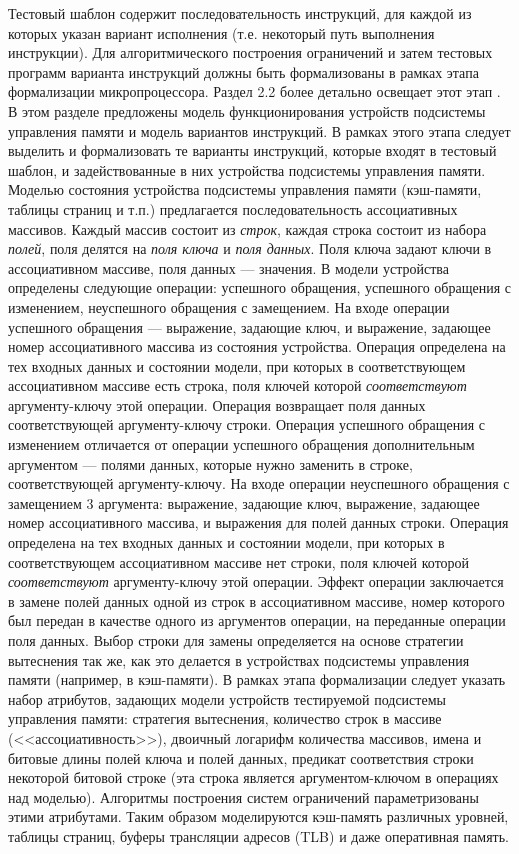 \documentclass[14pt,autoref,href
,facsimile
]{disser}
\begin{document}
Тестовый шаблон содержит последовательность инструкций, для каждой из которых указан вариант исполнения (т.е. некоторый путь выполнения инструкции). Для алгоритмического построения ограничений и затем тестовых программ варианта инструкций должны быть формализованы в рамках этапа формализации микропроцессора. Раздел 2.2 более детально освещает этот этап . В этом разделе предложены модель функционирования устройств подсистемы управления памяти и модель вариантов инструкций. В рамках этого этапа следует выделить и формализовать те варианты инструкций, которые входят в тестовый шаблон, и задействованные в них устройства подсистемы управления памяти. Моделью состояния устройства подсистемы управления памяти (кэш-памяти, таблицы страниц и т.п.) предлагается последовательность ассоциативных массивов. Каждый массив состоит из \emph{строк}, каждая строка состоит из набора \emph{полей}, поля делятся на \emph{поля ключа} и \emph{поля данных}. Поля ключа задают ключи в ассоциативном массиве, поля данных --- значения. В модели устройства определены следующие операции: успешного обращения, успешного обращения с изменением, неуспешного обращения с замещением. На входе операции успешного обращения --- выражение, задающие ключ, и выражение, задающее номер ассоциативного массива из состояния устройства. Операция определена на тех входных данных и состоянии модели, при которых в соответствующем ассоциативном массиве есть строка, поля ключей которой \emph{соответствуют} аргументу-ключу этой операции. Операция возвращает поля данных соответствующей аргументу-ключу строки. Операция успешного обращения с изменением отличается от операции успешного обращения дополнительным аргументом --- полями данных, которые нужно заменить в строке, соответствующей аргументу-ключу. На входе операции  неуспешного обращения с замещением 3 аргумента: выражение, задающие ключ, выражение, задающее номер ассоциативного массива, и выражения для полей данных строки. Операция определена на тех входных данных и состоянии модели, при которых в соответствующем ассоциативном массиве нет строки, поля ключей которой \emph{соответствуют} аргументу-ключу этой операции. Эффект операции заключается в замене полей данных одной из строк в ассоциативном массиве, номер которого был передан в качестве одного из аргументов операции, на переданные операции поля данных. Выбор строки для замены определяется на основе стратегии вытеснения так же, как это делается в устройствах подсистемы управления памяти (например, в кэш-памяти). В рамках этапа формализации следует указать набор атрибутов, задающих модели устройств тестируемой подсистемы управления памяти: стратегия вытеснения, количество строк в массиве (<<ассоциативность>>), двоичный логарифм количества массивов, имена и битовые длины полей ключа и полей данных, предикат соответствия строки некоторой битовой строке (эта строка является аргументом-ключом в операциях над моделью). Алгоритмы построения систем ограничений параметризованы этими атрибутами. Таким образом моделируются кэш-память различных уровней, таблицы страниц, буферы трансляции адресов (TLB) и даже оперативная память.
\end{document}
